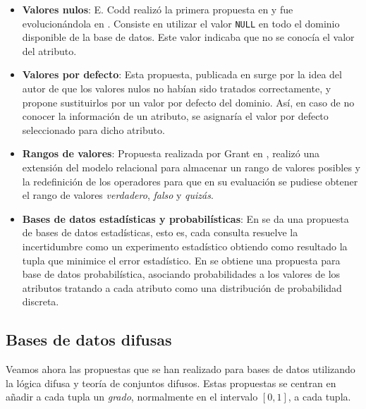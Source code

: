 \begin{itemize}
    \item \textbf{Valores nulos}: E. Codd realizó la primera propuesta en \cite{codd} y fue evolucionándola en \cite{codd1, codd2, codd3}. Consiste en utilizar el valor \texttt{NULL} en todo el dominio disponible de la base de datos. Este valor indicaba que no se conocía el valor del atributo.
    \item \textbf{Valores por defecto}: Esta propuesta, publicada en \cite{date} surge por la idea del autor de que los valores nulos no habían sido tratados correctamente, y propone sustituirlos por un valor por defecto del dominio. Así, en caso de no conocer la información de un atributo, se asignaría el valor por defecto seleccionado para dicho atributo.
    \item \textbf{Rangos de valores}: Propuesta realizada por Grant en \cite{grant}, realizó una extensión del modelo relacional para almacenar un rango de valores posibles y la redefinición de los operadores para que en su evaluación se pudiese obtener el rango de valores \textit{verdadero}, \textit{falso} y \textit{quizás}.
     \item \textbf{Bases de datos estadísticas y probabilísticas}: En \cite{wong} se da una propuesta de bases de datos estadísticas, esto es, cada consulta resuelve la incertidumbre como un experimento estadístico obtiendo como resultado la tupla que minimice el error estadístico. En \cite{dbprobabilistic} se obtiene una propuesta para base de datos probabilística, asociando probabilidades a los valores de los atributos tratando a cada atributo como una distribución de probabilidad discreta.
\end{itemize}

\subsection{Bases de datos difusas}

Veamos ahora las propuestas que se han realizado para bases de datos utilizando la lógica difusa y teoría de conjuntos difusos. Estas propuestas se centran en añadir a cada tupla un \textit{grado}, normalmente en el intervalo $[0,1]$, a cada tupla.

